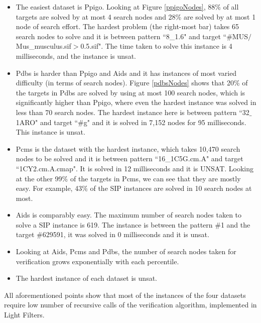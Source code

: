\documentclass{l4proj}
\newcounter{example}[section]
\begin{document}
\begin{itemize}
\item The easiest dataset is Ppigo. Looking at Figure \ref{ppigoNodes}, 88\% of all targets are solved by at most 4 search nodes and 28\% are solved by at most 1 node of search effort. The hardest problem (the right-most bar) takes 65 search nodes to solve and it is between pattern ``8\_1.6" and target ``\#MUS$/$Mus\_musculus.sif$>$0.5.sif". The time taken to solve this instance is 4 milliseconds, and the instance is \gls{unsat}.

\item Pdbs is harder than Ppigo and Aids and it has instances of most varied difficulty (in terms of search nodes). Figure \ref{pdbsNodes} shows that 20\% of the targets in Pdbs are solved by using at most 100 search nodes, which is significantly higher than Ppigo, where even the hardest instance was solved in less than 70 search nodes. The hardest instance here is between pattern ``32$\_$1ARO" and target ``\#g" and it is solved in 7,152 nodes for 95 milliseconds. This instance is \gls{unsat}. 

\item Pcms is the dataset with the hardest instance, which takes 10,470 search nodes to be solved and it is between pattern ``16\_1C5G.cm.A" and target ``1CY2.cm.A.cmap". It is solved in 12 milliseconds and it is UNSAT. Looking at the other 99\% of the targets in Pcms, we can see that they are mostly easy. For example, 43\% of the SIP instances are solved in 10 search nodes at most.

\item Aids is comparably easy. The maximum number of search nodes taken to solve a SIP instance is 619. The instance is between the pattern \#1 and the target \#629591, it was solved in 0 milliseconds and it is \gls{unsat}.

\item Looking at Aids, Pcms and Pdbs, the number of search nodes taken for verification grows exponentially with each percentile.

\item The hardest instance of each dataset is \gls{unsat}.

\end{itemize}

All aforementioned points show that most of the instances of the four datasets require low number of recursive calls of the verification algorithm, implemented in Light Filters.
\end{document}
